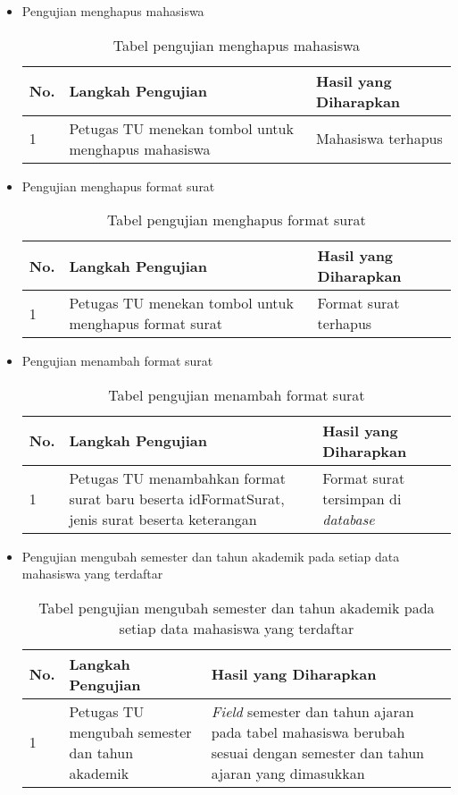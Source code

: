 \begin{itemize}
	\item Pengujian menghapus mahasiswa
	\begin{table}[H]
	\centering
	\caption{Tabel pengujian menghapus mahasiswa}
	\label{pengujian_menghapus_mahasiswa}
	\begin{tabular}{|l|p{6cm}|p{6cm}|}
	\hline
	\textbf{No.}&\textbf{Langkah Pengujian}&\textbf{Hasil yang Diharapkan}\\ \hline
	1&Petugas TU menekan tombol untuk menghapus mahasiswa&Mahasiswa terhapus \\ \hline
	\end{tabular}
	\end{table}
	
	\item Pengujian menghapus format surat
	\begin{table}[H]
	\centering
	\caption{Tabel pengujian menghapus format surat}
	\label{pengujian_menghapus_format_surat}
	\begin{tabular}{|l|p{6cm}|p{6cm}|}
	\hline
	\textbf{No.}&\textbf{Langkah Pengujian}&\textbf{Hasil yang Diharapkan}\\ \hline
	1&Petugas TU menekan tombol untuk menghapus format surat&Format surat terhapus\\ \hline
	\end{tabular}
	\end{table}
	
	\item Pengujian menambah format surat
	\begin{table}[H]
	\centering
	\caption{Tabel pengujian menambah format surat}
	\label{pengujian_menghapus_format_surat}
	\begin{tabular}{|l|p{6cm}|p{6cm}|}
	\hline
	\textbf{No.}&\textbf{Langkah Pengujian}&\textbf{Hasil yang Diharapkan}\\ \hline
	1&Petugas TU menambahkan format surat baru beserta idFormatSurat, jenis surat beserta keterangan&Format surat tersimpan di \textit{database}\\ \hline
	\end{tabular}
	\end{table}
	
	\item Pengujian mengubah semester dan tahun akademik pada setiap data mahasiswa yang terdaftar
	\begin{table}[H]
	\centering
	\caption{Tabel pengujian mengubah semester dan tahun akademik pada setiap data mahasiswa yang terdaftar}
	\label{pengujian_mengubah_semester_dan_tahun_akademik}
	\begin{tabular}{|l|p{6cm}|p{6cm}|}
	\hline
	\textbf{No.}&\textbf{Langkah Pengujian}&\textbf{Hasil yang Diharapkan}\\ \hline
	1&Petugas TU mengubah semester dan tahun akademik&\textit{Field} semester dan tahun ajaran pada tabel mahasiswa berubah sesuai dengan semester dan tahun ajaran yang dimasukkan\\ \hline
	\end{tabular}
	\end{table}
	
\end{itemize}